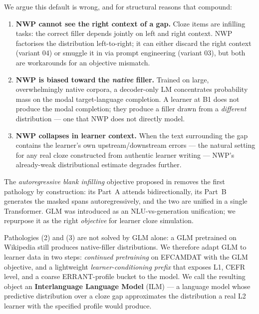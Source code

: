 \documentclass[11pt]{article}
\begin{document}
We argue this default is wrong, and for structural reasons that compound:

\begin{enumerate}[leftmargin=*,itemsep=0.3em]
    \item \textbf{NWP cannot see the right context of a gap.} Cloze items
    are infilling tasks: the correct filler depends jointly on left and
    right context. NWP factorises the distribution left-to-right; it can
    either discard the right context (variant 04) or smuggle it in via
    prompt engineering (variant 03), but both are workarounds for an
    objective mismatch.
    \item \textbf{NWP is biased toward the \emph{native} filler.} Trained
    on large, overwhelmingly native corpora, a decoder-only LM concentrates
    probability mass on the modal target-language completion. A learner at
    B1 does not produce the modal completion; they produce a filler drawn
    from a \emph{different} distribution --- one that NWP does not directly
    model.
    \item \textbf{NWP collapses in learner context.} When the text
    surrounding the gap contains the learner's own upstream/downstream
    errors --- the natural setting for any real cloze constructed from
    authentic learner writing --- NWP's already-weak distributional estimate
    degrades further.
\end{enumerate}

\noindent The \emph{autoregressive blank infilling} objective proposed in
\citet{du2022glm} removes the first pathology by construction: its Part~A
attends bidirectionally, its Part~B generates the masked spans
autoregressively, and the two are unified in a single Transformer. GLM was
introduced as an NLU-vs-generation unification; we repurpose it as the right
\emph{objective} for learner cloze simulation.

Pathologies (2) and (3) are not solved by GLM alone: a GLM pretrained on
Wikipedia still produces native-filler distributions. We therefore adapt
GLM to learner data in two steps: \emph{continued pretraining} on EFCAMDAT
with the GLM objective, and a lightweight \emph{learner-conditioning prefix}
that exposes L1, CEFR level, and a coarse ERRANT-profile bucket to the
model. We call the resulting object an \textbf{Interlanguage Language Model}
(ILM) --- a language model whose predictive distribution over a cloze gap
approximates the distribution a real L2 learner with the specified
profile would produce.
\end{document}
